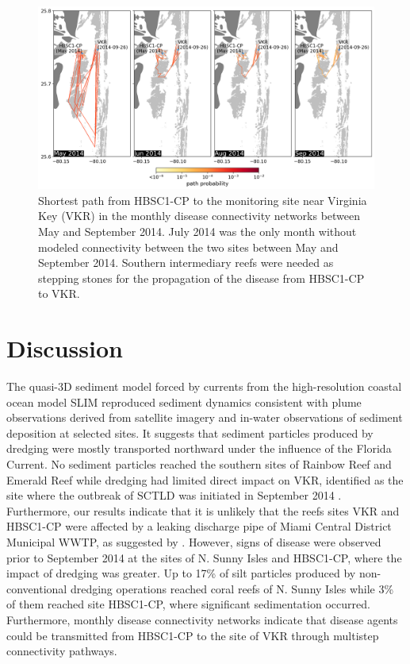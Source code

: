 \documentclass[preprint,12pt,authoryear]{elsarticle}
\begin{document}
\begin{figure}
	\centering
	\includegraphics[width=\textwidth]{figures/fig_paths_new.png}
	\caption{Shortest path from HBSC1-CP to the monitoring site near Virginia Key (VKR) in the monthly disease connectivity networks between May and September 2014. July 2014 was the only month without modeled connectivity between the two sites between May and September 2014. Southern intermediary reefs were needed as stepping stones for the propagation of the disease from HBSC1-CP to VKR.}
	\label{fig:onset_path}
\end{figure}

\section{Discussion}

The quasi-3D sediment model forced by currents from the high-resolution coastal ocean model SLIM reproduced sediment dynamics consistent with plume observations derived from satellite imagery and in-water observations of sediment deposition at selected sites. It suggests that sediment particles produced by dredging were mostly transported northward under the influence of the Florida Current. No sediment particles reached the southern sites of Rainbow Reef and Emerald Reef while dredging had limited direct impact on VKR, identified as the site where the outbreak of SCTLD was initiated in September 2014 \citep{precht2016unprecedented}. Furthermore, our results indicate that it is unlikely that the reefs sites VKR and HBSC1-CP were affected by a leaking discharge pipe of Miami Central District Municipal WWTP, as suggested by \cite{gintert2019regional}. However, signs of disease were observed prior to September 2014 at the sites of N. Sunny Isles and HBSC1-CP, where the impact of dredging was greater. Up to 17\% of silt particles produced by non-conventional dredging operations reached coral reefs of N. Sunny Isles while 3\% of them reached site HBSC1-CP, where significant sedimentation occurred. Furthermore, monthly disease connectivity networks indicate that disease agents could be transmitted from HBSC1-CP to the site of VKR through multistep connectivity pathways.   
\end{document}
